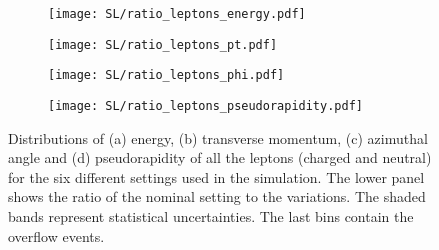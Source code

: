 \begin{figure}[H]
    \centering
    \begin{subfigure}{0.49\textwidth}
        \centering
        \texttt{[image: SL/ratio\_leptons\_energy.pdf]}
        \caption{}
        \label{app:subfig:E(leptons)_SL}
    \end{subfigure}
    \begin{subfigure}{0.49\textwidth}
        \centering
        \texttt{[image: SL/ratio\_leptons\_pt.pdf]}
        \caption{}
        \label{app:subfig:pt(leptons)_SL}
    \end{subfigure}

    \vspace{0.2cm}
    
    \begin{subfigure}{0.49\textwidth}
        \centering
        \texttt{[image: SL/ratio\_leptons\_phi.pdf]}
        \caption{}
        \label{app:subfig:phi(leptons)_SL}
    \end{subfigure}
    \begin{subfigure}{0.49\textwidth}
        \centering
        \texttt{[image: SL/ratio\_leptons\_pseudorapidity.pdf]}
        \caption{}
        \label{app:subfig:eta(leptons)_SL}
    \end{subfigure}
    \caption{Distributions of (a) energy, (b) transverse momentum,  (c) azimuthal angle and (d) pseudorapidity of all the leptons (charged and neutral) for the six different settings used in the simulation. The lower panel shows the ratio of the nominal setting to the variations. The shaded bands represent statistical uncertainties. The last bins contain the overflow events.}
    \label{app:fig:leptons_SL}
\end{figure}




